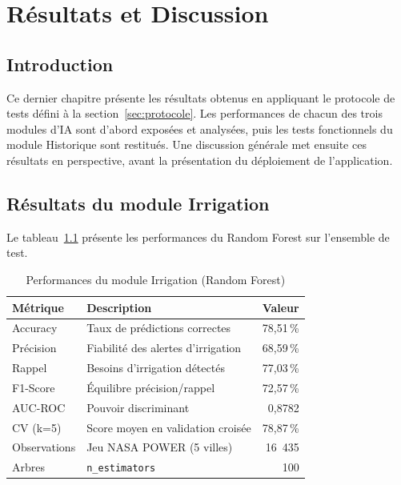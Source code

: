 
\chapter{Résultats et Discussion}
\label{chap:resultats}

\section*{Introduction}

Ce dernier chapitre présente les résultats obtenus en appliquant
le protocole de tests défini à la section~\ref{sec:protocole}.
Les performances de chacun des trois modules d'IA sont d'abord
exposées et analysées, puis les tests fonctionnels du module
Historique sont restitués. Une discussion générale met ensuite
ces résultats en perspective, avant la présentation du
déploiement de l'application.

\section{Résultats du module Irrigation}
\label{sec:res_irrigation}

Le tableau~\ref{tab:res_irr} présente les performances du Random
Forest sur l'ensemble de test.

\begin{table}[H]
	\centering
	\caption{Performances du module Irrigation (Random Forest)}
	\label{tab:res_irr}
	\begin{tabularx}{\textwidth}{lXr}
		\toprule
		\textbf{Métrique} & \textbf{Description} & \textbf{Valeur} \\
		\midrule
		Accuracy       & Taux de prédictions correctes      & 78,51\,\% \\
		Précision      & Fiabilité des alertes d'irrigation & 68,59\,\% \\
		Rappel         & Besoins d'irrigation détectés      & 77,03\,\% \\
		F1-Score       & Équilibre précision/rappel         & 72,57\,\% \\
		AUC-ROC        & Pouvoir discriminant               & 0,8782 \\
		CV (k=5)       & Score moyen en validation croisée  & 78,87\,\% \\
		\midrule
		Observations   & Jeu NASA POWER (5 villes)          & 16~435 \\
		Arbres         & \texttt{n\_estimators}             & 100 \\
		\bottomrule
	\end{tabularx}
\end{table}


